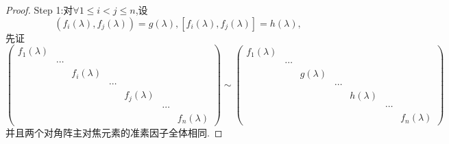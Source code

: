 \begin{proof}
  {\heiti Step 1:}对$\forall 1 \leq i < j \leq n$,设
  \[(f_i(\lambda),f_j(\lambda))=g(\lambda), [f_i(\lambda),f_j(\lambda)]=h(\lambda),\]
  先证
  \begin{equation}\label{eq:JD3}
    \begin{pmatrix}
      f_1(\lambda)&&&&&&\\
                  &\cdots&&&&&\\
                  &&f_i(\lambda)&&&&\\
                  &&&\cdots&&&\\
                  &&&&f_j(\lambda)&&\\
                  &&&&&\cdots&\\
      &&&&&&f_n(\lambda)
    \end{pmatrix}\sim
    \begin{pmatrix}
      f_1(\lambda)&&&&&&\\
      &\cdots&&&&&\\
      &&g(\lambda)&&&&\\
      &&&\cdots&&&\\
      &&&&h(\lambda)&&\\
      &&&&&\cdots&\\
      &&&&&&f_n(\lambda)
    \end{pmatrix}
  \end{equation}
  并且两个对角阵主对焦元素的准素因子全体相同.


\end{proof}
